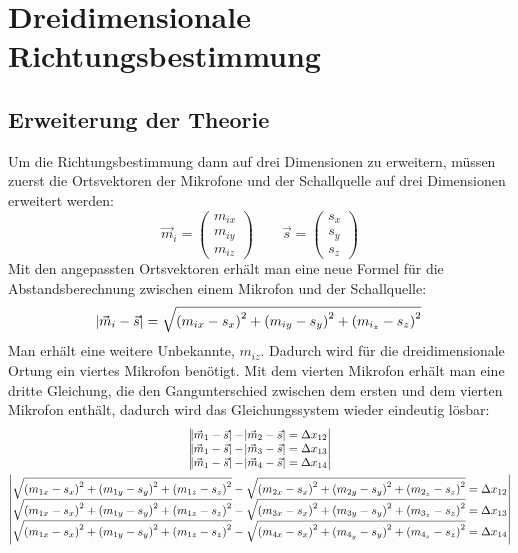 \section{Dreidimensionale Richtungsbestimmung}
\subsection{Erweiterung der Theorie}
Um die Richtungsbestimmung dann auf drei Dimensionen zu erweitern, müssen zuerst die Ortsvektoren der Mikrofone und der Schallquelle auf drei Dimensionen erweitert werden:
\begin{equation}
    \vec{m}_i = \begin{pmatrix}
        m_{ix} \\
        m_{iy} \\
        m_{iz}
    \end{pmatrix} \quad\quad
    \vec{s} = \begin{pmatrix}
        {s_x} \\
        {s_y} \\
        {s_z}
    \end{pmatrix}
\end{equation}
Mit den angepassten Ortsvektoren erhält man eine neue Formel für die Abstandsberechnung zwischen einem Mikrofon und der Schallquelle:
\begin{equation}
    \abs{\vec{m}_i - \vec{s}} = \sqrt{{(m_{ix} - s_x)}^2 + {(m_{iy} - s_y)}^2 + {(m_{i_z} - s_z)}^2}
\end{equation}
Man erhält eine weitere Unbekannte, $m_{iz}$. Dadurch wird für die dreidimensionale Ortung ein viertes Mikrofon benötigt. Mit dem vierten Mikrofon erhält man eine dritte Gleichung, die den Gangunterschied zwischen dem ersten und dem vierten Mikrofon enthält, dadurch wird das Gleichungssystem wieder eindeutig lösbar:
\begin{gather*}
    \begin{vmatrix}
        \abs{\vec{m}_1 - \vec{s}} - \abs{\vec{m}_2 - \vec{s}} = \Delta{x_{12}} \\
        \abs{\vec{m}_1 - \vec{s}} - \abs{\vec{m}_3 - \vec{s}} = \Delta{x_{13}} \\
        \abs{\vec{m}_1 - \vec{s}} - \abs{\vec{m}_4 - \vec{s}} = \Delta{x_{14}}
    \end{vmatrix}\\
    \begin{vmatrix}
        \sqrt{{(m_{1x} - s_x)}^2 + {(m_{1y} - s_y)}^2 + {(m_{1z} - s_z)}^2} - \sqrt{{(m_{2x} - s_x)}^2 + {(m_{2y} - s_y)}^2 + {(m_{2_z} - s_z)}^2} = \Delta{x_{12}} \\
        \sqrt{{(m_{1x} - s_x)}^2 + {(m_{1y} - s_y)}^2 + {(m_{1z} - s_z)}^2} - \sqrt{{(m_{3x} - s_x)}^2 + {(m_{3y} - s_y)}^2 + {(m_{3_z} - s_z)}^2} = \Delta{x_{13}} \\
        \sqrt{{(m_{1x} - s_x)}^2 + {(m_{1y} - s_y)}^2 + {(m_{1z} - s_z)}^2} - \sqrt{{(m_{4x} - s_x)}^2 + {(m_{4_y} - s_y)}^2 + {(m_{4_z} - s_z)}^2} = \Delta{x_{14}}
    \end{vmatrix}
\end{gather*}
